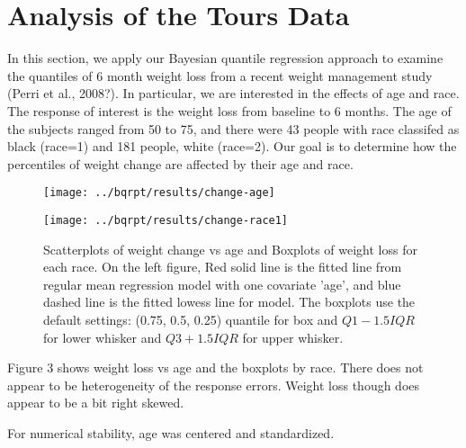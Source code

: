 \documentclass[12pt]{article}
\begin{document}
\section{Analysis of the Tours Data}
In this section, we apply our Bayesian quantile
regression approach to examine the quantiles of 6 month weight loss from a recent
weight management study (Perri et al., 2008?).  In particular, we are
interested in the effects of age and race.
The response of interest is the  weight loss
from  baseline to  6 months. The age of
the subjects ranged from 50 to 75, and there were 43 people with race
classifed as
black (race=1) and 181 people, white (race=2).
Our goal is to determine how  the percentiles of weight change
are affected by their age and race.

\begin{figure}[h]
  \begin{minipage}{0.5\linewidth}
    \centerline{\texttt{[image: ../bqrpt/results/change-age]}}
  \end{minipage}
  \begin{minipage}{0.5\linewidth}
    \centerline{\texttt{[image: ../bqrpt/results/change-race1]}}
  \end{minipage}

  \caption[]{\label{fig:tours} Scatterplots of weight change vs age and
    Boxplots of weight loss for each race. On the left figure, Red
    solid line is the   fitted line from regular mean regression model
    with one covariate   'age', and blue dashed line is the fitted
    lowess line for model.  The
    boxplots use the default settings: (0.75, 0.5, 0.25) quantile for
    box and $Q1-1.5IQR$ for lower whisker and $Q3+1.5IQR$ for upper
    whisker. }
\end{figure}

Figure 3 shows  weight loss vs age and the boxplots by race.
There does not appear to be
heterogeneity of the response errors. Weight loss though does appear
to be a bit right
skewed.

For numerical stability,
age was centered and standardized.
\end{document}
